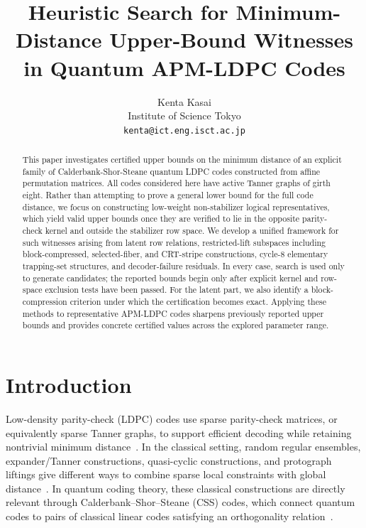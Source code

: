 \documentclass[11pt]{article}
\title{Heuristic Search for Minimum-Distance Upper-Bound Witnesses in Quantum APM-LDPC Codes}
\author{Kenta Kasai\\
Institute of Science Tokyo\\
\texttt{kenta@ict.eng.isct.ac.jp}}
\date{}
\theoremstyle{uprightthm}
\begin{document}
\maketitle

\begin{abstract}
This paper investigates certified upper bounds on the minimum distance of an
explicit family of Calderbank-Shor-Steane quantum LDPC codes constructed from
affine permutation matrices. All codes considered here have active Tanner graphs
of girth eight. Rather than attempting to prove a general lower bound for the
full code distance, we focus on constructing low-weight non-stabilizer logical
representatives, which yield valid upper bounds once they are verified to lie in
the opposite parity-check kernel and outside the stabilizer row space. We develop
a unified framework for such witnesses arising from latent row relations,
restricted-lift subspaces including block-compressed, selected-fiber, and
CRT-stripe constructions, cycle-8 elementary trapping-set structures, and
decoder-failure residuals. In every case, search is used only to generate
candidates; the reported bounds begin only after explicit kernel and row-space
exclusion tests have been passed. For the latent part, we also identify a
block-compression criterion under which the certification becomes exact.
Applying these methods to representative APM-LDPC codes sharpens previously
reported upper bounds and provides concrete certified values across the explored
parameter range.
\end{abstract}

\section{Introduction}
Low-density parity-check (LDPC) codes use sparse parity-check matrices, or
equivalently sparse Tanner graphs, to support efficient decoding while retaining
nontrivial minimum distance~\cite{Gallager1963,Tanner1981}. In the classical
setting, random regular ensembles, expander/Tanner constructions,
quasi-cyclic constructions, and protograph liftings give different ways to
combine sparse local constraints with global
distance~\cite{SipserSpielman1996,Fossorier2004,MitchellSmarandacheCostello2014}.
In quantum coding theory, these classical constructions are directly relevant through
Calderbank--Shor--Steane (CSS) codes, which connect quantum codes to pairs of
classical linear codes satisfying an orthogonality relation~\cite{CalderbankShor1996,Steane1996}.
\end{document}
